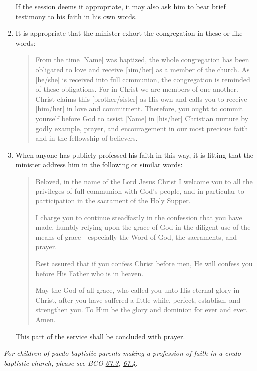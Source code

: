 \documentclass[
]{book}
\begin{document}
\begin{enumerate}
  If the session deems it appropriate, it may also ask him to bear brief testimony to his faith in his own words.
\item
  It is appropriate that the minister exhort the congregation in these or like words:

  \begin{quote}
  From the time {[}Name{]} was baptized, the whole congregation has been obligated to love and receive {[}him/her{]} as a member of the church. As {[}he/she{]} is received into full communion, the congregation is reminded of these obligations. For in Christ we are members of one another. Christ claims this {[}brother/sister{]} as His own and calls you to receive {[}him/her{]} in love and commitment. Therefore, you ought to commit yourself before God to assist {[}Name{]} in {[}his/her{]} Christian nurture by godly example, prayer, and encouragement in our most precious faith and in the fellowship of believers.
  \end{quote}
\item
  When anyone has publicly professed his faith in this way, it is fitting that the minister address him in the following or similar words:

  \begin{quote}
  Beloved, in the name of the Lord Jesus Christ I welcome you to all the privileges of full communion with God's people, and in particular to participation in the sacrament of the Holy Supper.

  I charge you to continue steadfastly in the confession that you have made, humbly relying upon the grace of God in the diligent use of the means of grace---especially the Word of God, the sacraments, and prayer.

  Rest assured that if you confess Christ before men, He will confess you before His Father who is in heaven.

  May the God of all grace, who called you unto His eternal glory in Christ, after you have suffered a little while, perfect, establish, and strengthen you. To Him be the glory and dominion for ever and ever. Amen.
  \end{quote}

  This part of the service shall be concluded with prayer.
\end{enumerate}

\emph{For children of paedo-baptistic parents making a profession of faith in a credo-baptistic church, please see BCO \protect\hyperlink{67.3}{67.3}, \protect\hyperlink{67.4}{67.4}.}
\end{document}
